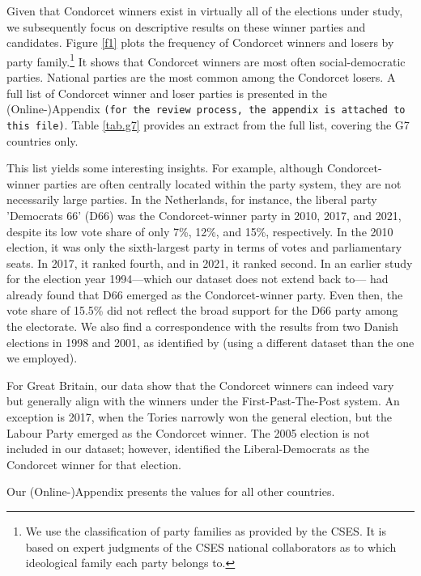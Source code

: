 \documentclass[12pt]{scrartcl}
\begin{document}
Given that Condorcet winners exist in virtually all of the elections under study, we subsequently focus on descriptive results on these winner parties and candidates. Figure \ref{f1} plots the frequency of Condorcet winners and losers by party family.\footnote{
    We use the classification of party families as provided by the CSES. It is based on expert judgments of the CSES national collaborators as to which ideological family each party belongs to. 
} It shows that Condorcet winners are most often social-democratic parties. National parties are the most common among the Condorcet losers. A full list of Condorcet winner and loser parties is presented in the (Online-)Appendix \texttt{(for the review process, the appendix is attached to this file)}. Table \ref{tab.g7} provides an extract from the full list, covering the G7 countries only.



This list yields some interesting insights. For example, although Condorcet-winner parties are often centrally located within the party system, they are not necessarily large parties. In the Netherlands, for instance, the liberal party 'Democrats 66' (D66) was the Condorcet-winner party in 2010, 2017, and 2021, despite its low vote share of only 7\%, 12\%, and 15\%, respectively. In the 2010 election, it was only the sixth-largest party in terms of votes and parliamentary seats. In 2017, it ranked fourth, and in 2021, it ranked second. In an earlier study for the election year 1994---which our dataset does not extend back to---\cite{vanDeemen1998} had already found that D66 emerged as the Condorcet-winner party. Even then, the vote share of 15.5\% did not reflect the broad support for the D66 party among the electorate. We also find a correspondence with the results from two Danish elections in 1998 and 2001, as identified by \cite{KurrildKlitgaard2008} (using a different dataset than the one we employed). 

For Great Britain, our data show that the Condorcet winners can indeed vary but generally align with the winners under the First-Past-The-Post system. An exception is 2017, when the Tories narrowly won the general election, but the Labour Party emerged as the Condorcet winner. The 2005 election is not included in our dataset; however, \cite{Abramson2013} identified the Liberal-Democrats as the Condorcet winner for that election.

Our (Online-)Appendix presents the values for all other countries.
\end{document}
